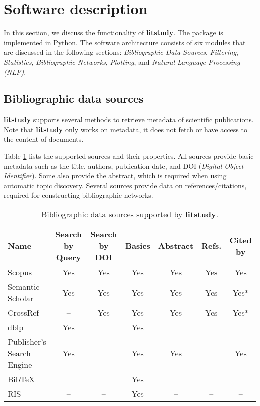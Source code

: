 \section{Software description}

In this section, we discuss the functionality of \textbf{litstudy}. The package is implemented in Python. The software architecture consists of six modules that are discussed in the following sections: \textit{Bibliographic Data Sources}, \textit{Filtering}, \textit{Statistics}, \textit{Bibliographic Networks}, \textit{Plotting}, and \textit{Natural Language Processing (NLP)}.

\subsection{Bibliographic data sources}

\textbf{litstudy} supports several methods to retrieve metadata of scientific publications. Note that \textbf{litstudy} only works on metadata, it does not fetch or have access to the content of documents.

Table \ref{tab:sources} lists the supported sources and their properties. All sources provide basic metadata such as the title, authors, publication date, and DOI (\textit{Digital Object Identifier}). Some also provide the abstract, which is required when using automatic topic discovery. Several sources provide data on references/citations, required for constructing bibliographic networks.

\begin{table}[h]
\centering
\caption{Bibliographic data sources supported by \textbf{litstudy}.}
\label{tab:sources}
\begin{tabular}{@{}lcccccc@{}}
\toprule
Name & Search by Query & Search by DOI & Basics & Abstract & Refs. & Cited by \\
\midrule
Scopus & Yes & Yes & Yes & Yes & Yes & Yes \\
Semantic Scholar & Yes & Yes & Yes & Yes & Yes & Yes* \\
CrossRef & -- & Yes & Yes & Yes & Yes & Yes* \\
dblp & Yes & -- & Yes & -- & -- & -- \\
Publisher's Search Engine & Yes & -- & Yes & Yes & -- & Yes \\
BibTeX & -- & -- & Yes & -- & -- & -- \\
RIS & -- & -- & Yes & -- & -- & -- \\
\bottomrule
\end{tabular}
\end{table}

